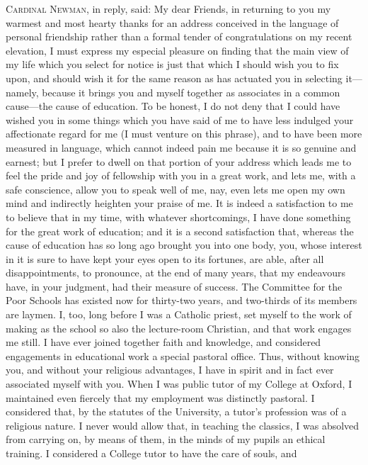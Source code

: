 C\textsc{ardinal} N\textsc{ewman},
in reply, said: My dear Friends, in returning to you my warmest and
most hearty thanks for an address conceived in the language of
personal friendship rather than a formal tender of congratulations on
my recent elevation, I must express my especial pleasure on finding
that the main view of my life which you select for notice is just that
which I should wish you to fix upon, and should wish it for the same
reason as has actuated you in selecting it—namely, because it brings
you and myself together as associates in a common cause—the cause of
education. To be honest, I do not deny that I could have wished
you in some things which you have said of me to have less indulged
your affectionate regard for me (I must venture on this phrase), and
to have been more measured in language, which cannot indeed pain me
because it is so genuine and earnest; but I prefer to dwell on that
portion of your address which leads me to feel the pride and joy of
fellowship with you in a great work, and lets me, with a safe
conscience, allow you to speak well of me, nay, even lets me open my
own mind and indirectly heighten your praise of me. It is indeed a
satisfaction to me to believe that in my time, with whatever
shortcomings, I have done something for the great work of education;
and it is a second satisfaction that, whereas the cause of education
has so long ago brought you into one body, you, whose interest in it
is sure to have kept your eyes open to its fortunes, are able, after
all disappointments, to pronounce, at the end of many years, that my
endeavours have, in your judgment, had their measure of success. The
Committee for the Poor Schools has existed now for thirty-two years,
and two-thirds of its members are laymen. I, too, long before I was a
Catholic priest, set myself to the work of making as the school so
also the lecture-room Christian, and that work engages me still. I
have ever joined together faith and knowledge, and considered
engagements in educational work a special pastoral office. Thus,
without knowing you, and without your religious advantages, I have in
spirit and in fact ever associated myself with you. When I was public
tutor of my College at Oxford, I maintained even fiercely that my
employment was distinctly pastoral. I considered that, by the statutes
of the University, a tutor's profession was of a religious nature. I
never would allow that, in teaching the classics, I was absolved from
carrying on, by means of them, in the minds of my pupils an ethical
training. I considered a College tutor to have the care of souls, and
